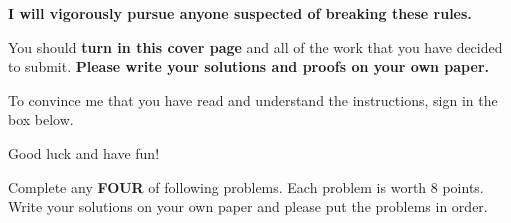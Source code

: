 \documentclass[11pt]{scrartcl}
\theoremstyle{definition}
\begin{document}
\begin{center}
\textbf{I will vigorously pursue anyone suspected of breaking these rules.}
\end{center}

\bigskip

You should \textbf{turn in this cover page} and all of the work that you have decided to submit. \textbf{Please write your solutions and proofs on your own paper.}

\bigskip

To convince me that you have read and understand the instructions, sign in the box below.

\bigskip


\bigskip

Good luck and have fun!

\newpage

Complete any \textbf{FOUR} of following problems.  Each problem is worth 8 points. Write your solutions on your own paper and please put the problems in order.
\end{document}
